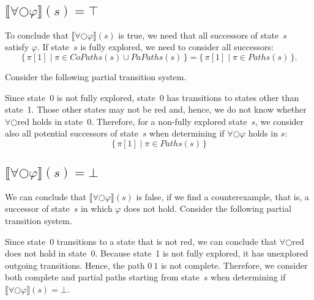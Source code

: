 \documentclass[12pt]{article}
\newcommand{\nxt}{\bigcirc}
\theoremstyle{definition}
\newcommand{\satisfaction}[1]{\llbracket #1 \rrbracket}
\newcommand{\bottom}{\mathord{\perp}}
\begin{document}
\subsection*{$\satisfaction{\forall \nxt \varphi}(s) = \top$}

To conclude that $\satisfaction{\forall \nxt \varphi}(s)$ is true, we need that all successors of state~$s$ satisfy $\varphi$.  If state~$s$ is fully explored, we need to consider all successors:
\[
\{\, \pi[1] \mid \pi \in \mathit{CoPaths}(s) \cup \mathit{PaPaths}(s) \,\}
= \{\, \pi[1] \mid \pi \in \mathit{Paths}(s) \,\}.
\]

Consider the following partial transition system.
\begin{center}
\end{center}
Since state~0 is not fully explored, state~0 has transitions to states other than state~1.  Those other states may not be red and, hence, we do not know whether  $\forall \nxt \mbox{red}$ holds in state~0.  Therefore, for a non-fully explored state~$s$, we consider also all potential successors of state~$s$ when determining if $\forall \nxt \varphi$ holds in $s$:
\[
\{\, \pi[1] \mid \pi \in \mathit{Paths}(s) \,\}
\]

\subsection*{$\satisfaction{\forall \nxt \varphi}(s) = \bottom$}

We can conclude that $\satisfaction{\forall \nxt \varphi}(s)$ is false, if we find a counterexample, that is, a successor of state~$s$ in which $\varphi$ does not hold.  Consider the following partial transition system.
\begin{center}
\end{center}
Since state~0 transitions to a state that is not red, we can conclude that $\forall \nxt \mbox{red}$ does not hold in state~0.  Because state~1 is not fully explored, it has unexplored outgoing transitions.  Hence, the path $0\ 1$ is not complete.  Therefore, we consider both complete and partial paths starting from state~$s$ when determining if $\satisfaction{\forall \nxt \varphi}(s) = \bottom$.
\end{document}
